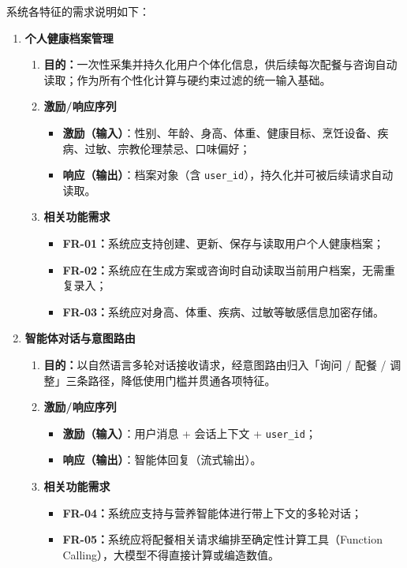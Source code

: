 \documentclass[12pt,a4paper]{ctexart}
\begin{document}
系统各特征的需求说明如下：

\begin{enumerate}
\item \textbf{个人健康档案管理}
  \begin{enumerate}[label=(\arabic*), leftmargin=10pt, itemsep=2pt, topsep=2pt]
    \item \textbf{目的：}一次性采集并持久化用户个体化信息，供后续每次配餐与咨询自动读取；作为所有个性化计算与硬约束过滤的统一输入基础。
    \item \textbf{激励/响应序列}
      \begin{itemize}[leftmargin=*, itemsep=1pt, topsep=1pt]
        \item \textbf{激励（输入）}：性别、年龄、身高、体重、健康目标、烹饪设备、疾病、过敏、宗教伦理禁忌、口味偏好；
        \item \textbf{响应（输出）}：档案对象（含 \texttt{user\_id}），持久化并可被后续请求自动读取。
      \end{itemize}
    \item \textbf{相关功能需求}
      \begin{itemize}[leftmargin=*, itemsep=1pt, topsep=1pt]
        \item \textbf{FR-01：}系统应支持创建、更新、保存与读取用户个人健康档案；
        \item \textbf{FR-02：}系统应在生成方案或咨询时自动读取当前用户档案，无需重复录入；
        \item \textbf{FR-03：}系统应对身高、体重、疾病、过敏等敏感信息加密存储。
      \end{itemize}
  \end{enumerate}

\item \textbf{智能体对话与意图路由}
  \begin{enumerate}[label=(\arabic*), leftmargin=10pt, itemsep=2pt, topsep=2pt]
    \item \textbf{目的：}以自然语言多轮对话接收请求，经意图路由归入「询问 / 配餐 / 调整」三条路径，降低使用门槛并贯通各项特征。
    \item \textbf{激励/响应序列}
      \begin{itemize}[leftmargin=*, itemsep=1pt, topsep=1pt]
        \item \textbf{激励（输入）}：用户消息 + 会话上下文 + \texttt{user\_id}；
        \item \textbf{响应（输出）}：智能体回复（流式输出）。
      \end{itemize}
    \item \textbf{相关功能需求}
      \begin{itemize}[leftmargin=*, itemsep=1pt, topsep=1pt]
        \item \textbf{FR-04：}系统应支持与营养智能体进行带上下文的多轮对话；
        \item \textbf{FR-05：}系统应将配餐相关请求编排至确定性计算工具（Function Calling），大模型不得直接计算或编造数值。
      \end{itemize}
  \end{enumerate}


\end{enumerate}
\end{document}
